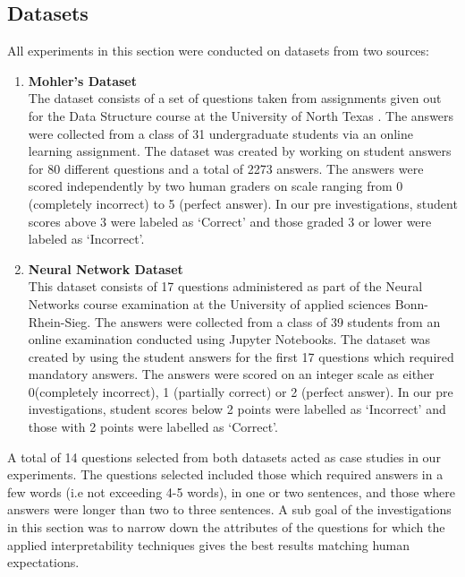\documentclass[letterpaper, 10 pt, conference]{ieeeconf}  %
\begin{document}
\subsection{Datasets} 

All experiments in this section were conducted on datasets from two sources:
\begin{enumerate}
\item \textbf{Mohler's Dataset}\\
The dataset consists of a set of questions taken from assignments given out for the Data Structure course at the University of North Texas \cite{mohler2011learning}. The answers were collected from a class of 31 undergraduate students via an online learning assignment. The dataset was created by working on student answers for 80 different questions and a total of 2273 answers. The answers were scored independently by two human graders on scale ranging from 0 (completely incorrect) to 5 (perfect answer). In our pre investigations, student scores above 3 were labeled as `Correct' and those graded 3 or lower were labeled as `Incorrect'. 
\item \textbf{Neural Network Dataset}\\
This dataset consists of 17 questions administered as part of the Neural Networks course examination at the University of applied sciences Bonn-Rhein-Sieg. The answers were collected from a class of 39 students from an online examination conducted using Jupyter Notebooks. The dataset was created by using the student answers for the first 17 questions which required mandatory answers. The answers were scored on an integer scale as either 0(completely incorrect), 1 (partially correct) or 2 (perfect answer). In our pre investigations, student scores below 2 points were labelled as `Incorrect' and those with 2 points were labelled as `Correct'.
\end{enumerate}
A total of 14 questions selected from both datasets acted as case studies in our experiments. The questions selected included those which required answers in a few words (i.e not exceeding 4-5 words), in one or two sentences, and those where answers were longer than two to three sentences. A sub goal of the investigations in this section was to narrow down the attributes of the questions for which the applied interpretability techniques gives the best results matching human expectations.
\end{document}
